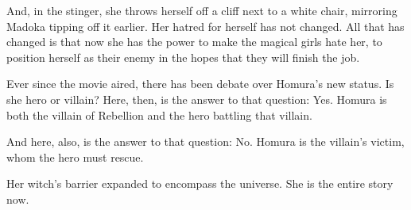 And, in the stinger, she throws herself off a cliff next to a white chair, mirroring Madoka tipping off it earlier. Her hatred for herself has not changed. All that has changed is that now she has the power to make the magical girls hate her, to position herself as their enemy in the hopes that they will finish the job.

Ever since the movie aired, there has been debate over Homura's new status. Is she hero or villain? Here, then, is the answer to that question: Yes. Homura is both the villain of Rebellion and the hero battling that villain.

And here, also, is the answer to that question: No. Homura is the villain's victim, whom the hero must rescue.

Her witch's barrier expanded to encompass the universe. She is the entire story now.
